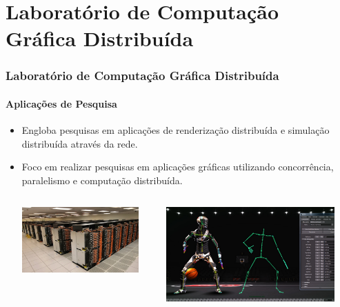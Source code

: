 \documentclass{beamer}
\begin{document}
\section[]{Laboratório de Computação Gráfica Distribuída}
\begin{frame}
\frametitle{Laboratório de Computação Gráfica Distribuída}
\framesubtitle{Aplicações de Pesquisa}
\begin{itemize}
\item{Engloba pesquisas em aplicações de renderização distribuída e simulação distribuída através da rede.}
\item{Foco em realizar pesquisas em aplicações gráficas utilizando concorrência, paralelismo e computação distribuída.}

\vspace{10pt}
\begin{columns}
\begin{column}{0.5\textwidth}
    \centering
    \includegraphics[width=0.9\textwidth]{compdist.png}
\end{column}
\begin{column}{0.5\textwidth}
    \centering
    \includegraphics[width=0.9\textwidth]{rend.png}
\end{column}
\end{columns}

\end{itemize}
\end{frame}
\end{document}
